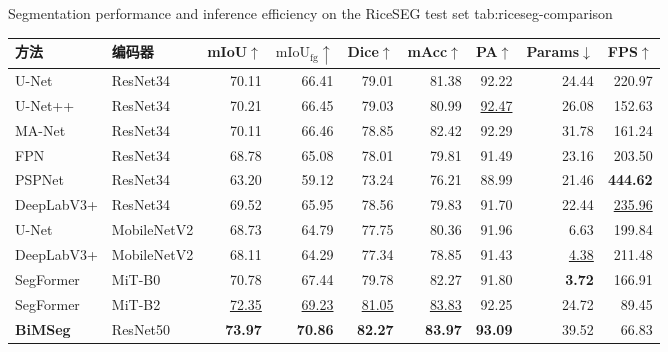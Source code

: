 \begin{table}[!htb]
  \centering
    {Segmentation performance and inference efficiency on the RiceSEG test set}
    {tab:riceseg-comparison}
  \begin{spacing}{1.2}
    \small
    \setlength{\tabcolsep}{2pt}
    \renewcommand{\arraystretch}{1.15}
    \begin{tabular*}{\linewidth}{@{\extracolsep{\fill}}llrrrrrrr@{}}
      \toprule
      方法 & 编码器 & mIoU\(\uparrow\) & \(\mathrm{mIoU}_{\mathrm{fg}}\uparrow\)
        & Dice\(\uparrow\) & mAcc\(\uparrow\) & PA\(\uparrow\)
        & Params\(\downarrow\) & FPS\(\uparrow\) \\
      \midrule
      U-Net & ResNet34
        & 70.11 & 66.41 & 79.01 & 81.38 & 92.22 & 24.44 & 220.97 \\
      U-Net++ & ResNet34
        & 70.21 & 66.45 & 79.03 & 80.99 & \underline{92.47} & 26.08 & 152.63 \\
      MA-Net & ResNet34
        & 70.11 & 66.46 & 78.85 & 82.42 & 92.29 & 31.78 & 161.24 \\
      FPN & ResNet34
        & 68.78 & 65.08 & 78.01 & 79.81 & 91.49 & 23.16 & 203.50 \\
      PSPNet & ResNet34
        & 63.20 & 59.12 & 73.24 & 76.21 & 88.99 & 21.46 & \textbf{444.62} \\
      DeepLabV3+ & ResNet34
        & 69.52 & 65.95 & 78.56 & 79.83 & 91.70 & 22.44 & \underline{235.96} \\
      U-Net & MobileNetV2
        & 68.73 & 64.79 & 77.75 & 80.36 & 91.96 & 6.63 & 199.84 \\
      DeepLabV3+ & MobileNetV2
        & 68.11 & 64.29 & 77.34 & 78.85 & 91.43 & \underline{4.38} & 211.48 \\
      SegFormer & MiT-B0
        & 70.78 & 67.44 & 79.78 & 82.27 & 91.80 & \textbf{3.72} & 166.91 \\
      SegFormer & MiT-B2
        & \underline{72.35} & \underline{69.23} & \underline{81.05}
        & \underline{83.83} & 92.25 & 24.72 & 89.45 \\
      \midrule
      \textbf{BiMSeg} & ResNet50
        & \textbf{73.97} & \textbf{70.86} & \textbf{82.27}
        & \textbf{83.97} & \textbf{93.09} & 39.52 & 66.83 \\
      \bottomrule
    \end{tabular*}
  \end{spacing}
  \par\vspace{8pt}

\end{table}
